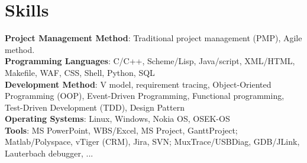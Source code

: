 
\section{Skills}
\textbf{Project Management Method}: Traditional project management (PMP), Agile method.\\

\textbf{Programming Languages}: C/C++, Scheme/Lisp, Java/script, XML/HTML, Makefile, WAF, CSS, Shell, Python, SQL\\

\textbf{Development Method}:
V model, requirement tracing,
Object-Oriented Programming (OOP),
Event-Driven Programming,
Functional programming,
Test-Driven Development (TDD),
Design Pattern\\

\textbf{Operating Systems}: Linux, Windows, Nokia OS, OSEK-OS\\

\textbf{Tools}:
MS PowerPoint,
WBS/Excel, MS Project, GanttProject;
Matlab/Polyspace,
vTiger (CRM), Jira, SVN;
MuxTrace/USBDiag, GDB/JLink, Lauterbach debugger, ...

